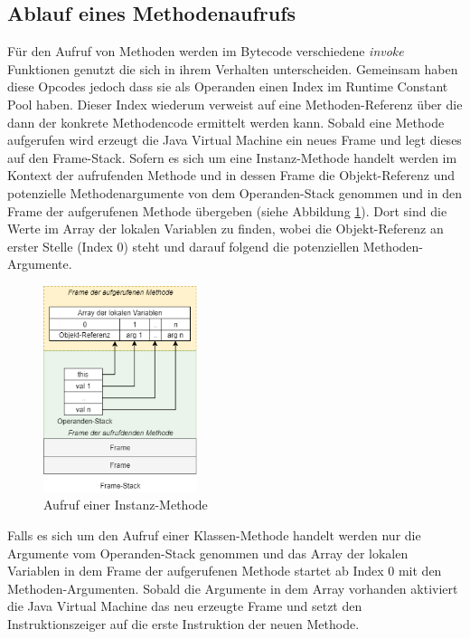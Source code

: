 \documentclass[conference]{IEEEtran}
\begin{document}
\subsection{Ablauf eines Methodenaufrufs}
Für den Aufruf von Methoden werden im Bytecode verschiedene \textit{invoke} Funktionen genutzt die sich in ihrem Verhalten unterscheiden. Gemeinsam haben diese Opcodes jedoch dass sie als Operanden einen Index  im Runtime Constant Pool haben. Dieser Index wiederum verweist auf eine Methoden-Referenz über die dann der konkrete Methodencode ermittelt werden kann. Sobald eine Methode aufgerufen wird erzeugt die Java Virtual Machine ein neues Frame und legt dieses auf den Frame-Stack. Sofern es sich um eine Instanz-Methode handelt werden im Kontext der aufrufenden Methode und in dessen Frame die Objekt-Referenz und potenzielle Methodenargumente von dem Operanden-Stack genommen und in den Frame der aufgerufenen Methode übergeben (siehe Abbildung \ref{fig:aufrufMethode}). Dort sind die Werte im Array der lokalen Variablen zu finden, wobei die Objekt-Referenz an erster Stelle (Index 0) steht und darauf folgend die potenziellen Methoden-Argumente. 

\begin{figure}[htbp] 
  \centering
     \includegraphics[width=0.4\textwidth]{Grafiken/MethodenAufrufJVM.png}
  \caption{Aufruf einer Instanz-Methode}
  \label{fig:aufrufMethode}
\end{figure}

Falls es sich um den Aufruf einer Klassen-Methode handelt werden nur die Argumente vom Operanden-Stack genommen und das Array der lokalen Variablen in dem Frame der aufgerufenen Methode startet ab Index 0 mit den Methoden-Argumenten. Sobald die Argumente in dem Array vorhanden aktiviert die Java Virtual Machine das neu erzeugte Frame und setzt den Instruktionszeiger auf die erste Instruktion der neuen Methode.\cite{Venners.1997}
\end{document}

